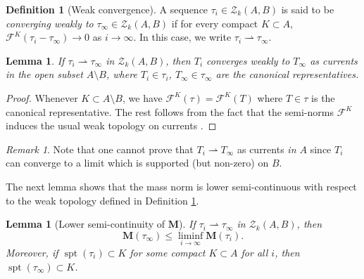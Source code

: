 \documentclass[10pt]{amsart}
\newtheorem{lemma}[theorem]{Lemma}
\theoremstyle{definition}
\newtheorem{definition}[theorem]{Definition}
\theoremstyle{remark}
\newtheorem{remark}[theorem]{Remark}
\numberwithin{equation}{section}
\newcommand{\F}{\mathcal{F}}
\newcommand{\weakto}{\rightharpoonup}
\newcommand{\Z}{\mathcal{Z}}
\newcommand{\M}{\mathbf{M}}
\newcommand{\spt}{\operatorname{spt}}
\begin{document}
\begin{definition}[Weak convergence]
\label{D:weak-topology}
A sequence $\tau_i \in \Z_k(A,B)$ is said to be \emph{converging weakly to } $\tau_\infty \in \Z_k(A,B)$ if for every compact $K \subset A$, $\F^K(\tau_i -\tau_\infty) \to 0$ as $i \to \infty$. In this case, we write $\tau_i \weakto \tau_\infty$.
\end{definition}

\begin{lemma}
\label{L:weak-topology}
If $\tau_i \weakto \tau_\infty$ in $\Z_k(A,B)$, then $T_i$ converges weakly to $T_\infty$ as currents in the open subset $A \setminus B$, where $T_i \in \tau_i$, $T_\infty \in \tau_\infty$ are the canonical representatives.
\end{lemma}

\begin{proof}
Whenever $K \subset A \setminus B$, we have $\F^K(\tau)=\F^K(T)$ where $T \in \tau$ is the canonical representative. The rest follows from the fact that the semi-norms $\F^K$ induces the usual weak topology on currents \cite[31.2]{Simon}.
\end{proof}

\begin{remark}
Note that one cannot prove that $T_i \weakto T_\infty$ as currents \emph{in $A$} since $T_i$ can converge to a limit which is supported (but non-zero) on $B$.
\end{remark}

The next lemma shows that the mass norm is lower semi-continuous with respect to the weak topology defined in Definition \ref{D:weak-topology}. 

\begin{lemma}[Lower semi-continuity of $\M$]
\label{L:lower-semicts}
If $\tau_i \weakto \tau_\infty$ in $\Z_k(A, B)$, then 
\[ \M(\tau_{\infty})\leq\liminf_{i\rightarrow\infty}\M(\tau_i).\]
Moreover, if $\spt(\tau_i)\subset K$ for some compact $K \subset A$ for all $i$, then $\spt(\tau_{\infty})\subset K$.
\end{lemma}
\end{document}
